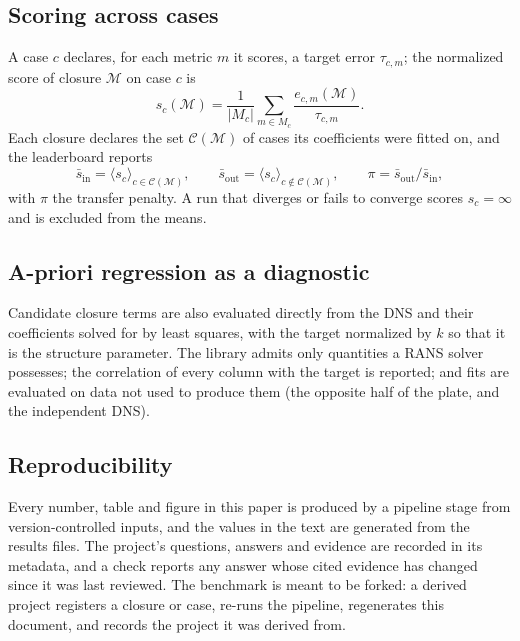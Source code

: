 \documentclass[lineno]{jfm}
\begin{document}
\subsection{Scoring across cases}\label{sec:scoring}

A case $c$ declares, for each metric $m$ it scores, a target error
$\tau_{c,m}$; the normalized score of closure $\mathcal{M}$ on case $c$ is
\begin{equation}
  s_c(\mathcal{M}) = \frac{1}{|M_c|} \sum_{m \in M_c}
    \frac{e_{c,m}(\mathcal{M})}{\tau_{c,m}}.
  \label{eq:score}
\end{equation}
Each closure declares the set $\mathcal{C}(\mathcal{M})$ of cases its
coefficients were fitted on, and the leaderboard reports
\begin{equation}
  \bar{s}_{\mathrm{in}} = \langle s_c \rangle_{c \in \mathcal{C}(\mathcal{M})},
  \qquad
  \bar{s}_{\mathrm{out}} = \langle s_c \rangle_{c \notin \mathcal{C}(\mathcal{M})},
  \qquad
  \pi = \bar{s}_{\mathrm{out}} / \bar{s}_{\mathrm{in}},
  \label{eq:split}
\end{equation}
with $\pi$ the transfer penalty. A run that diverges or fails to converge
scores $s_c = \infty$ and is excluded from the means.

\subsection{A-priori regression as a diagnostic}

Candidate closure terms are also evaluated directly from the DNS and their
coefficients solved for by least squares, with the target normalized by $k$
so that it is the structure parameter. The library admits only quantities a
RANS solver possesses; the correlation of every column with the target is
reported; and fits are evaluated on data not used to produce them (the
opposite half of the plate, and the independent DNS).

\subsection{Reproducibility}

Every number, table and figure in this paper is produced by a pipeline
stage from version-controlled inputs, and the values in the text are
generated from the results files. The project's questions, answers and
evidence are recorded in its metadata, and a check reports any answer whose
cited evidence has changed since it was last reviewed. The benchmark is
meant to be forked: a derived project registers a closure or case, re-runs
the pipeline, regenerates this document, and records the project it was
derived from.
\end{document}
